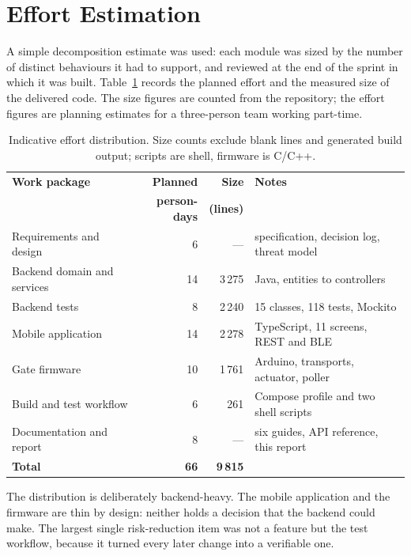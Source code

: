 \section{Effort Estimation}

A simple decomposition estimate was used: each module was sized by the number of
distinct behaviours it had to support, and reviewed at the end of the sprint in
which it was built. Table~\ref{tab:effort} records the planned effort and the
measured size of the delivered code. The size figures are counted from the
repository; the effort figures are planning estimates for a three-person team
working part-time.

\begin{table}[htbp]
  \centering
  \small
  \begin{tabularx}{\textwidth}{@{}lrrX@{}}
    \toprule
    \textbf{Work package} & \textbf{Planned} & \textbf{Size} & \textbf{Notes} \\
    & \textbf{person-days} & \textbf{(lines)} & \\
    \midrule
    Requirements and design & 6 & --- & specification, decision log, threat model \\
    Backend domain and services & 14 & 3\,275 & Java, entities to controllers \\
    Backend tests & 8 & 2\,240 & 15 classes, 118 tests, Mockito \\
    Mobile application & 14 & 2\,278 & TypeScript, 11 screens, REST and BLE \\
    Gate firmware & 10 & 1\,761 & Arduino, transports, actuator, poller \\
    Build and test workflow & 6 & 261 & Compose profile and two shell scripts \\
    Documentation and report & 8 & --- & six guides, API reference, this report \\
    \midrule
    \textbf{Total} & \textbf{66} & \textbf{9\,815} & \\
    \bottomrule
  \end{tabularx}
  \caption{Indicative effort distribution. Size counts exclude blank lines and
  generated build output; scripts are shell, firmware is C/C++.}
  \label{tab:effort}
\end{table}

The distribution is deliberately backend-heavy. The mobile application and the
firmware are thin by design: neither holds a decision that the backend could make.
The largest single risk-reduction item was not a feature but the test workflow,
because it turned every later change into a verifiable one.
